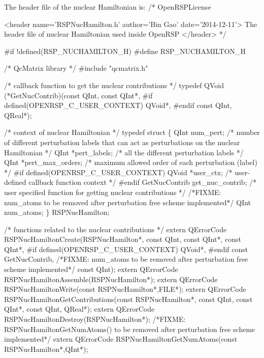 The header file of the nuclear Hamiltonian is:
\nwenddocs{}\endmoddef
/*
  \LA{}OpenRSPLicense~{\nwtagstyle{}}\RA{}

  <header name='RSPNucHamilton.h' author='Bin Gao' date='2014-12-11'>
    The header file of nuclear Hamiltonian used inside OpenRSP
  </header>
*/

#if !defined(RSP_NUCHAMILTON_H)
#define RSP_NUCHAMILTON_H

/* QcMatrix library */
#include "qcmatrix.h"

/* callback function to get the nuclear contributions */
typedef QVoid (*GetNucContrib)(const QInt,
                               const QInt*,
#if defined(OPENRSP_C_USER_CONTEXT)
                               QVoid*,
#endif
                               const QInt,
                               QReal*);

/* context of nuclear Hamiltonian */
typedef struct \{
    QInt num_pert;                  /* number of different perturbation labels that
                                       can act as perturbations on the nuclear Hamiltonian */
    QInt *pert_labels;              /* all the different perturbation labels */
    QInt *pert_max_orders;          /*  maximum allowed order of each perturbation (label) */
#if defined(OPENRSP_C_USER_CONTEXT)
    QVoid *user_ctx;                /* user-defined callback function context */
#endif
    GetNucContrib get_nuc_contrib;  /* user specified function for getting nuclear contributions */
/*FIXME: num_atoms to be removed after perturbation free scheme implemented*/
    QInt num_atoms;
\} RSPNucHamilton;

/* functions related to the nuclear contributions */
extern QErrorCode RSPNucHamiltonCreate(RSPNucHamilton*,
                                       const QInt,
                                       const QInt*,
                                       const QInt*,
#if defined(OPENRSP_C_USER_CONTEXT)
                                       QVoid*,
#endif
                                       const GetNucContrib,
/*FIXME: num_atoms to be removed after perturbation free scheme implemented*/
                                       const QInt);
extern QErrorCode RSPNucHamiltonAssemble(RSPNucHamilton*);
extern QErrorCode RSPNucHamiltonWrite(const RSPNucHamilton*,FILE*);
extern QErrorCode RSPNucHamiltonGetContributions(const RSPNucHamilton*,
                                                 const QInt,
                                                 const QInt*,
                                                 const QInt,
                                                 QReal*);
extern QErrorCode RSPNucHamiltonDestroy(RSPNucHamilton*);
/*FIXME: RSPNucHamiltonGetNumAtoms() to be removed after perturbation free scheme implemented*/
extern QErrorCode RSPNucHamiltonGetNumAtoms(const RSPNucHamilton*,QInt*);

